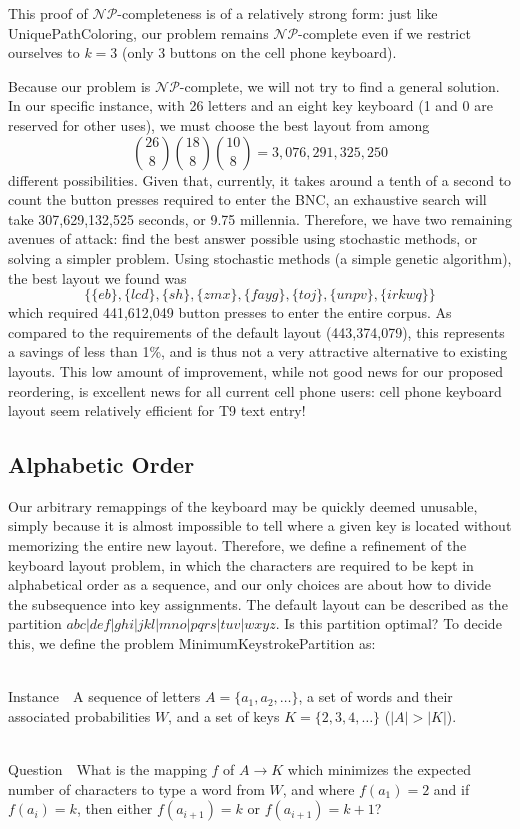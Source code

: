 \documentclass[runningheads]{llncs}
\newcommand{\NP}{\ensuremath{\mathcal{NP}}}
\newcommand{\Instance}{{\sc Instance~}}
\newcommand{\Question}{~\\
{\sc Question~}}
\begin{document}
This proof of \NP-completeness is of a relatively strong form: just like {\sc UniquePathColoring}, our problem remains \NP-complete even if we restrict ourselves to $k=3$ (only 3 buttons on the cell phone keyboard).

Because our problem is \NP-complete, we will not try to find a general solution.  In our specific instance, with 26 letters and an eight key keyboard (1 and 0 are reserved for other uses),  we must choose the best layout from among $$\binom{26}{8} \binom{18}{8} \binom{10}{8} = 3,076,291,325,250$$ different possibilities.  Given that, currently, it takes around a tenth of a second to count the button presses required to enter the BNC, an exhaustive search will take 307,629,132,525 seconds, or 9.75 millennia.  Therefore, we have two remaining avenues of attack: find the best answer possible using stochastic methods, or solving a simpler problem.  Using stochastic methods (a simple genetic algorithm), the best layout we found was 
$$\{\{eb\}, \{lcd\}, \{sh\}, \{zmx\}, \{fayg\}, \{toj\}, \{unpv\}, \{irkwq\}\}$$
which required 441,612,049 button presses to enter the entire corpus.   As compared to the requirements of the default layout (443,374,079), this represents a savings of less than 1\%, and is thus not a very attractive alternative to existing layouts.  This low amount of improvement, while not good news for our proposed reordering, is excellent news for all current cell phone users: cell phone keyboard layout seem relatively efficient for T9 text entry!

\subsection{Alphabetic Order}

Our arbitrary remappings of the keyboard may be quickly deemed
unusable, simply because it is almost impossible to tell where a given key is located without memorizing the entire new layout.  Therefore, we define a refinement of the keyboard layout problem, in which the
characters are required to be kept in alphabetical order as a sequence, and our
only choices are about how to divide the subsequence into key assignments.  The
default layout can be described as the partition
$abc|def|ghi|jkl|mno|pqrs|tuv|wxyz$.  Is this partition optimal?  To
decide this, we define the problem {\sc MinimumKeystrokePartition} as:
\begin{prob}[{\sc MinimumKeystrokePartition}]~\\
\label{thm:minpartition}
\Instance\ A sequence of letters $A = \{a_1, a_2, \ldots \}$, a set of words and their associated probabilities $W$, and a set of keys $K = \{2, 3, 4, \ldots \}$ ($|A| > |K|$).

\Question\ What is the mapping $f$ of $A \to K$ which minimizes the expected number of characters to type a word from $W$, and where $f(a_1) = 2$ and if $f(a_i) = k$, then either $f(a_{i+1}) = k$ or $f(a_{i+1}) = k+1$?
\end{prob}
\end{document}
